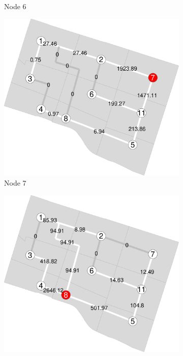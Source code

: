 \documentclass[]{elsarticle} %
\begin{document}
\begin{figure}
\begin{subfigure}{0.32\textwidth}
  \caption{Node 6}
\end{subfigure}
\begin{subfigure}{0.32\textwidth}
  \centering
  \includegraphics[width=1\linewidth]{Plots/sp7.pdf}  
  \caption{Node 7}
\end{subfigure}
\begin{subfigure}{0.32\textwidth}
  \centering
  \includegraphics[width=1\linewidth]{Plots/sp8.pdf}  

\end{subfigure}
\end{figure}
\end{document}
